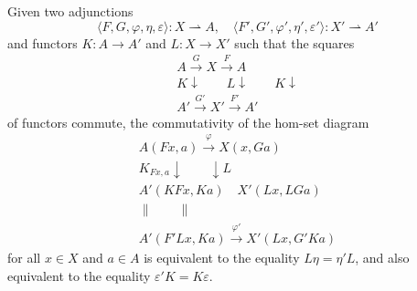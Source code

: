 Given two adjunctions
$$\langle F, G, \varphi, \eta, \varepsilon \rangle : X \rightharpoonup A, \quad \langle F', G', \varphi', \eta', \varepsilon' \rangle : X' \rightharpoonup A'$$
and functors $K : A \to A'$ and $L : X \to X'$ such that the squares
$$\begin{array}{c}
A \xrightarrow{G} X \xrightarrow{F} A \\
K \downarrow \quad \quad L \downarrow \quad \quad K \downarrow \\
A' \xrightarrow{G'} X' \xrightarrow{F'} A'
\end{array}$$
of functors commute, the commutativity of the hom-set diagram
$$\begin{array}{c}
A(Fx, a) \xrightarrow{\varphi} X(x, Ga) \\
K_{Fx, a} \downarrow \quad \quad \downarrow L \\
A'(KFx, Ka) \quad X'(Lx, LGa) \\
\parallel \quad \quad \parallel \\
A'(F'Lx, Ka) \xrightarrow{\varphi'} X'(Lx, G'Ka)
\end{array}$$
for all $x \in X$ and $a \in A$ is equivalent to the equality $L\eta = \eta'L$, and also equivalent to the equality $\varepsilon'K = K\varepsilon$.
